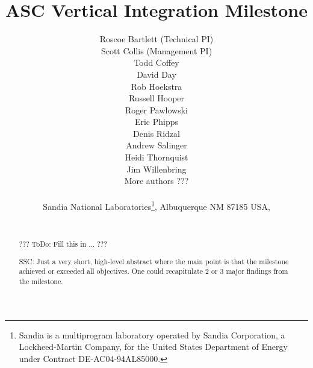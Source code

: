 \documentclass[pdf,ps2pdf,11pt]{SANDreport}
\title{\center
ASC Vertical Integration Milestone
}
\author{
Roscoe Bartlett (Technical PI) \\
Scott Collis (Management PI) \\
Todd Coffey \\
David Day \\
Rob Hoekstra \\
Russell Hooper \\
Roger Pawlowski \\
Eric Phipps \\
Denis Ridzal \\
Andrew Salinger \\
Heidi Thornquist \\
Jim Willenbring \\
More authors ???\\ \\
Sandia National
Laboratories\footnote{ Sandia is a multiprogram laboratory operated by Sandia
Corporation, a Lockheed-Martin Company, for the United States Department of
Energy under Contract DE-AC04-94AL85000.}, Albuquerque NM 87185 USA, \\ \\
\date{}
}
\date{}
\begin{document}
\maketitle

%

%
\begin{abstract}
%

??? ToDo: Fill this in ... ???

\bigskip
SSC: Just a very short, high-level abstract where the main point is that the
milestone achieved or exceeded all objectives.  One could recapitulate 2 or 3
major findings from the milestone.

%
\end{abstract}
%

%
%
%

%


\end{document}
